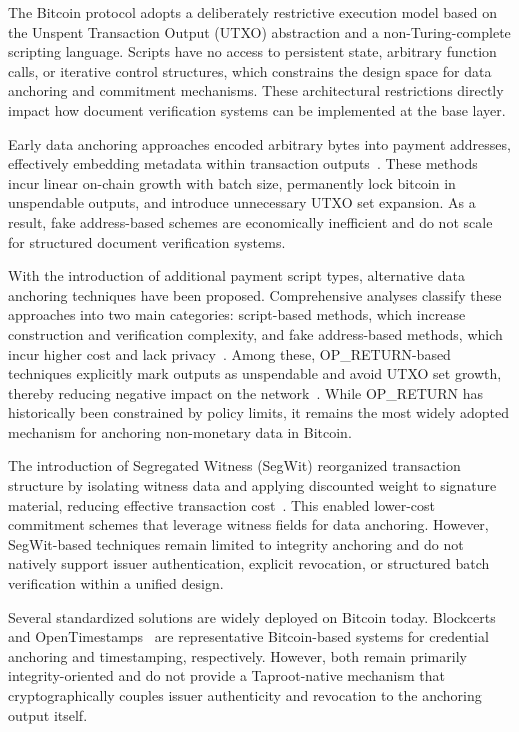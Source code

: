 \documentclass[preprint,12pt]{elsarticle}
\begin{document}
The Bitcoin protocol adopts a deliberately restrictive execution model based on the Unspent Transaction Output (UTXO) abstraction and a non-Turing-complete scripting language.
Scripts have no access to persistent state, arbitrary function calls, or iterative control structures, which constrains the design space for data anchoring and commitment mechanisms.
These architectural restrictions directly impact how document verification systems can be implemented at the base layer.

Early data anchoring approaches encoded arbitrary bytes into payment addresses, effectively embedding metadata within transaction outputs~\cite{Gao2017Decentralized}.
These methods incur linear on-chain growth with batch size, permanently lock bitcoin in unspendable outputs, and introduce unnecessary UTXO set expansion.
As a result, fake address-based schemes are economically inefficient and do not scale for structured document verification systems.

With the introduction of additional payment script types, alternative data anchoring techniques have been proposed.
Comprehensive analyses classify these approaches into two main categories: script-based methods, which increase construction and verification complexity, and fake address-based methods, which incur higher cost and lack privacy~\cite{Bartoletti2019BitcoinMetadata}.
Among these, OP\_RETURN-based techniques explicitly mark outputs as unspendable and avoid UTXO set growth, thereby reducing negative impact on the network~\cite{Strehle2020DominatingOPReturns}.
While OP\_RETURN has historically been constrained by policy limits, it remains the most widely adopted mechanism for anchoring non-monetary data in Bitcoin.

The introduction of Segregated Witness (SegWit) reorganized transaction structure by isolating witness data and applying discounted weight to signature material, reducing effective transaction cost~\cite{Kedziora2022AnalysisSegWit}.
This enabled lower-cost commitment schemes that leverage witness fields for data anchoring.
However, SegWit-based techniques remain limited to integrity anchoring and do not natively support issuer authentication, explicit revocation, or structured batch verification within a unified design.

Several standardized solutions are widely deployed on Bitcoin today.
Blockcerts~\cite{Blockcerts} and OpenTimestamps~\cite{OpenTimestamps} are representative Bitcoin-based systems for credential anchoring and timestamping, respectively. 
However, both remain primarily integrity-oriented and do not provide a Taproot-native mechanism that cryptographically couples issuer authenticity and revocation to the anchoring output itself.
\end{document}
